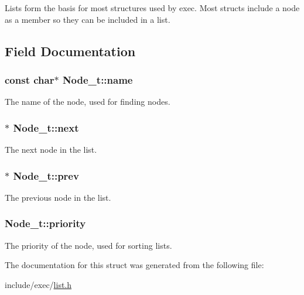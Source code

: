 Lists form the basis for most structures used by exec. Most structs include a node as a member so they can be included in a list. 

\subsection{Field Documentation}
\hypertarget{structNode__t_a599dccb2151a020f680b5f630b7c066b}{
\subsubsection[{name}]{\setlength{\rightskip}{0pt plus 5cm}const char$\ast$ Node\+\_\+t\+::name}}\label{structNode__t_a599dccb2151a020f680b5f630b7c066b}


The name of the node, used for finding nodes. 

\hypertarget{structNode__t_aad52b1ee2ade4a4338147eea00037878}{
\subsubsection[{next}]{$\ast$ Node\+\_\+t\+::next}}\label{structNode__t_aad52b1ee2ade4a4338147eea00037878}


The next node in the list. 

\hypertarget{structNode__t_ad75a52c8366f3dc84deb11268762472f}{
\subsubsection[{prev}]{$\ast$ Node\+\_\+t\+::prev}}\label{structNode__t_ad75a52c8366f3dc84deb11268762472f}


The previous node in the list. 

\hypertarget{structNode__t_ab051ee9099777b73f61535b154db369d}{
\subsubsection[{priority}]{ Node\+\_\+t\+::priority}}\label{structNode__t_ab051ee9099777b73f61535b154db369d}


The priority of the node, used for sorting lists. 



The documentation for this struct was generated from the following file\+:\begin{DoxyCompactItemize}
\item 
include/exec/\hyperlink{list_8h}{list.\+h}\end{DoxyCompactItemize}
